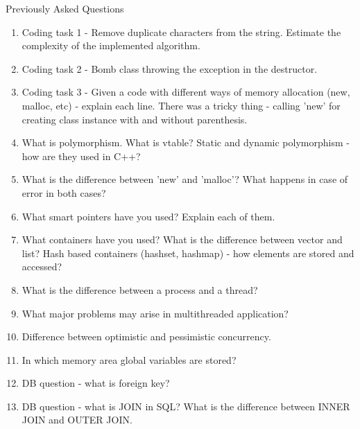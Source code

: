 \documentclass[a4paper, 10pt]{article}
\begin{document}
Previously Asked Questions
\begin{enumerate}
\item Coding task 1 - Remove duplicate characters from the string. Estimate the complexity of the implemented algorithm.
\item Coding task 2 - Bomb class throwing the exception in the destructor.
\item Coding task 3 - Given  a code with different ways of memory allocation (new, malloc, etc) - explain each line. There was a tricky thing - calling 'new' for creating class instance with and without parenthesis.
\item What is polymorphism. What is vtable? Static and dynamic polymorphism - how are they used in C++?
\item What is the difference between 'new' and 'malloc'? What happens in case of error in both cases?
\item What smart pointers have you used? Explain each of them.
\item What containers have you used? What is the difference between vector and list? Hash based containers (hashset, hashmap) - how elements are stored and accessed?
\item What is the difference between a process and a thread?
\item What major problems may arise in multithreaded application?
\item Difference between optimistic and pessimistic concurrency.
\item In which memory area global variables are stored?
\item DB question - what is foreign key?
\item DB question - what is JOIN in SQL? What is the difference between INNER JOIN and OUTER JOIN.
\end{enumerate}
\end{document}
